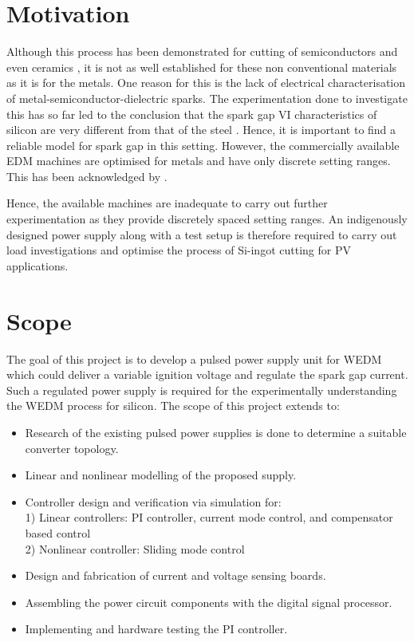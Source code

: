 \section{Motivation}
	Although this process has been demonstrated for cutting of semiconductors and even ceramics \cite{sanchez2001development}, it is not as well established for these non conventional materials as it is for the metals. One reason for this is the lack of electrical characterisation of metal-semiconductor-dielectric sparks. The experimentation done to investigate this has so far led to the conclusion that the spark gap VI characteristics of silicon are very different from that of the steel \cite{kane2017aps}. Hence, it is important to find a reliable model for spark gap in this setting. However, the commercially available EDM machines are optimised for metals and have only discrete setting ranges. This has been acknowledged by \citet{levy1990wed}.

	Hence, the available machines are inadequate to carry out further experimentation as they provide discretely spaced setting ranges. An indigenously designed power supply along with a test setup is therefore required to carry out load investigations and optimise the process of Si-ingot cutting for PV applications.

\section{Scope}

	The goal of this project is to develop a pulsed power supply unit for WEDM which could deliver a variable ignition voltage and regulate the spark gap current. Such a regulated power supply is required for the experimentally understanding the WEDM process for silicon. The scope of this project extends to:
	\begin{itemize}
	\item Research of the existing pulsed power supplies is done to determine a suitable converter topology.
	\item Linear and  nonlinear modelling of the proposed supply.
	\item Controller design and verification via simulation for:\\
	1) Linear controllers: PI controller, current mode control, and compensator based control\\
	2) Nonlinear controller: Sliding mode control
	\item Design and fabrication of current and voltage sensing boards.
	\item Assembling the power circuit components with the digital signal processor.
	\item Implementing and hardware testing the PI controller.
	\end{itemize}

